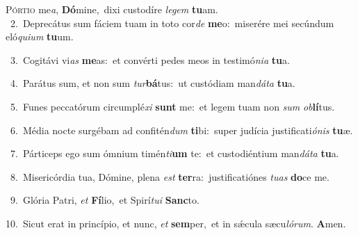 \lettrine{\initial\textcolor{\initialcolor}{P}}{órtio} me\-\textit{a}\-, \textbf{Dó}\-mine,~\star dixi custodíre \textit{le}\-\textit{gem} \textbf{tu}\-am.\\
{\numbfont\textcolor{\numbcolor}{~2.}}~Deprecátus sum fáciem tuam in toto cor\textit{de} \textbf{me}\-o:~\star miserére mei secúndum eló\-\textit{qui}\-\textit{um} \textbf{tu}\-um.\par
{\numbfont\textcolor{\numbcolor}{~3.}}~Cogitávi vi\textit{as} \textbf{me}\-as:~\star et convérti pedes meos in testimó\-\textit{ni}\-\textit{a} \textbf{tu}\-a.\par
{\numbfont\textcolor{\numbcolor}{~4.}}~Parátus sum, et non sum \textit{tur}\-\textbf{bá}tus:~\star ut custódiam man\-\textit{dá}\-\textit{ta} \textbf{tu}\-a.\par
{\numbfont\textcolor{\numbcolor}{~5.}}~Funes peccatórum circumplé\textit{xi} \textbf{sunt} me:~\star et legem tuam non \textit{sum} \textit{ob}\-\textbf{lí}tus.\par
{\numbfont\textcolor{\numbcolor}{~6.}}~Média nocte surgébam ad confitén\textit{dum} \textbf{ti}\-bi:~\star super judícia justificati\-\textit{ó}\-\textit{nis} \textbf{tu}\-æ.\par
{\numbfont\textcolor{\numbcolor}{~7.}}~Párticeps ego sum ómnium timén\-\textit{ti}\-\textbf{um} te:~\star et custodiéntium man\-\textit{dá}\-\textit{ta} \textbf{tu}\-a.\par
{\numbfont\textcolor{\numbcolor}{~8.}}~Misericórdia tua, Dómine, plena \textit{est} \textbf{ter}\-ra:~\star justificatiónes \textit{tu}\-\textit{as} \textbf{do}\-ce me.\par
{\numbfont\textcolor{\numbcolor}{~9.}}~Glória Patri, \textit{et} \textbf{Fí}\-lio,~\star et Spirí\-\textit{tu}\-\textit{i} \textbf{Sanc}\-to.\par
{\numbfont\textcolor{\numbcolor}{10.}}~Sicut erat in princípio, et nunc, \textit{et} \textbf{sem}\-per,~\star et in sǽcula sæcu\-\textit{ló}\-\textit{rum}. \textbf{A}\-men.\par
